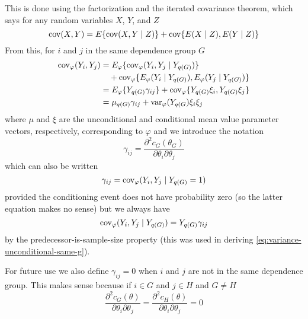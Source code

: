 This is done using the factorization and the iterated covariance theorem,
which says for any random variables $X$, $Y$, and $Z$
$$
   \operatorname{cov}(X, Y) = E\{ \operatorname{cov}(X, Y \mid Z) \} + \operatorname{cov}\{E(X \mid Z), E(Y \mid Z)\}
$$
From this, for $i$ and $j$ in the same dependence group $G$
\begin{equation}
\begin{split} \label{eq:variance-unconditional-same-g}
   \operatorname{cov}_\varphi(Y_i, Y_j)
   & =
   E_\varphi\{ \operatorname{cov}_\varphi(Y_i, Y_j \mid Y_{q(G)}) \}
   \\
   & \quad
   + \operatorname{cov}_\varphi\{E_\varphi(Y_i \mid Y_{q(G)}), E_\varphi(Y_j \mid Y_{q(G)})\}
   \\
   & =
   E_\varphi\{ Y_{q(G)} \gamma_{i j} \}
   + \operatorname{cov}_\varphi\{ Y_{q(G)} \xi_i, Y_{q(G)} \xi_j\}
   \\
   & =
   \mu_{q(G)} \gamma_{i j} + \operatorname{var}_\varphi(Y_{q(G}) \xi_i \xi_j
\end{split}
\end{equation}
where $\mu$ and $\xi$ are the unconditional and conditional mean value
parameter vectors, respectively, corresponding to $\varphi$ and we introduce
the notation
$$
   \gamma_{i j}
   =
   \frac{\partial^2 c_G(\theta_G)}{\partial \theta_i \partial \theta_j}
$$
which can also be written
\begin{equation} \label{eq:sigma}
   \gamma_{i j}
   =
   \operatorname{cov}_\varphi(Y_i, Y_j \mid Y_{q(G)} = 1)
\end{equation}
provided the conditioning event does not have probability zero (so the
latter equation makes no sense) but we always have
$$
   \operatorname{cov}_\varphi(Y_i, Y_j \mid Y_{q(G)} ) = Y_{q(G)} \gamma_{i j}
$$
by the predecessor-is-sample-size property
(this was used in deriving \eqref{eq:variance-unconditional-same-g}).

For future use we also define $\gamma_{i j} = 0$ when $i$ and $j$ are
not in the same dependence group.  This makes sense because if $i \in G$
and $j \in H$ and $G \neq H$
$$
   \frac{\partial^2 c_G(\theta)}{\partial \theta_i \partial \theta_j}
   =
   \frac{\partial^2 c_H(\theta)}{\partial \theta_i \partial \theta_j}
   =
   0
$$

